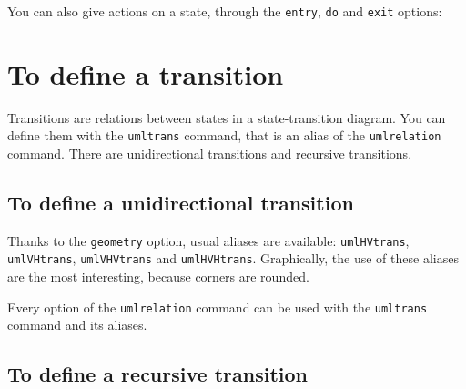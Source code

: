 \documentclass[a4paper,11pt]{report}
\begin{document}
\medskip

You can also give actions on a state, through the {\tt entry}, {\tt do} and {\tt exit} options:

\medskip

\begin{minipage}{0.51\textwidth}
	
\end{minipage}
\begin{minipage}{0.49\textwidth}
	\begin{center}
	\end{center}
\end{minipage}

\section{To define a transition}\label{s.trans}

Transitions are relations between states in a state-transition diagram. You can define them with the {\tt umltrans} command, that is an alias of the {\tt umlrelation} command. There are unidirectional transitions and recursive transitions.

\subsection{To define a unidirectional transition}\label{s.unitrans}

Thanks to the {\tt geometry} option, usual aliases are available: {\tt umlHVtrans}, {\tt umlVHtrans}, {\tt umlVHVtrans} and {\tt umlHVHtrans}. Graphically, the use of these aliases are the most interesting, because corners are rounded.

\medskip

\begin{minipage}{0.51\textwidth}
	
\end{minipage}
\begin{minipage}{0.49\textwidth}
	\begin{center}
	\end{center}
\end{minipage}

\medskip

Every option of the {\tt umlrelation} command can be used with the {\tt umltrans} command and its aliases.

\subsection{To define a recursive transition}\label{s.rectrans}
\end{document}
